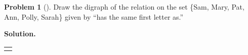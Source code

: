 \documentclass[10pt,]{book}
\theoremstyle{plain}
\theoremstyle{definition}
\newtheorem{activity}[project]{Problem}
\theoremstyle{definition}
\numberwithin{equation}{chapter}
\newlength{\panelmax}
\begin{document}
\begin{activity}[]\label{activity-335}
Draw the digraph of the relation on the set \{Sam, Mary, Pat, Ann, Polly, Sarah\} given by ``has the same first letter as.''%
\par\medskip\noindent%
\textbf{Solution.}\quad %
{%
\setlength{\panelmax}{0pt}
\newsavebox{\panelboxAUimage}
\newlength{\phAUimage}\setlength{\phAUimage}{\ht\panelboxAUimage+\dp\panelboxAUimage}
\settototalheight{\phAUimage}{\usebox{\panelboxAUimage}}
\setlength{\panelmax}{\maxof{\panelmax}{\phAUimage}}
\leavevmode%
\setlength{\tabcolsep}{0\linewidth}
\par\medskip\noindent
\hspace*{0.25\linewidth}%
\begin{tabular}{@{}*{1}{c}@{}}
\begin{minipage}[c][\panelmax][t]{0.5\linewidth}\usebox{\panelboxAUimage}\end{minipage}\end{tabular}\\
}%
\end{activity}
\typeout{************************************************}
\typeout{************************************************}
\end{document}

